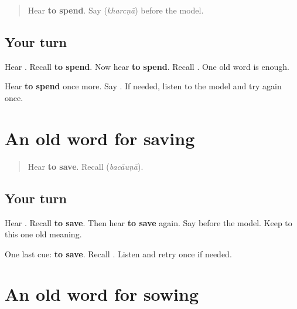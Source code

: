 \label{lesson:PA-R165-spend-again}



\begin{quote}
Hear \textbf{to spend}. Say \textbf{} (\emph{kharcṇā}) before the model.
\end{quote}

\subsection*{Your turn}
Hear \textbf{}. Recall \textbf{to spend}. Now hear \textbf{to spend}. Recall \textbf{}. One old word is enough.

\begin{tcolorbox}[breakable,colback=teal!4,colframe=teal!35!black,title={Before you move on}]
Hear \textbf{to spend} once more. Say \textbf{}. If needed, listen to the model and try again once.
\end{tcolorbox}
\section[\texorpdfstring{\pa{ਬਚਾਉਣਾ} (bacāuṇā)}{ਬਚਾਉਣਾ (bacāuṇā)}]{An old word for saving}

\label{lesson:PA-R165-save-again}



\begin{quote}
Hear \textbf{to save}. Recall \textbf{} (\emph{bacāuṇā}).
\end{quote}

\subsection*{Your turn}
Hear \textbf{}. Recall \textbf{to save}. Then hear \textbf{to save} again. Say \textbf{} before the model. Keep to this one old meaning.

\begin{tcolorbox}[breakable,colback=teal!4,colframe=teal!35!black,title={Before you move on}]
One last cue: \textbf{to save}. Recall \textbf{}. Listen and retry once if needed.
\end{tcolorbox}
\section[\texorpdfstring{\pa{ਬੀਜਣਾ} (bījṇā)}{ਬੀਜਣਾ (bījṇā)}]{An old word for sowing}

\label{lesson:PA-R165-sow-again}



